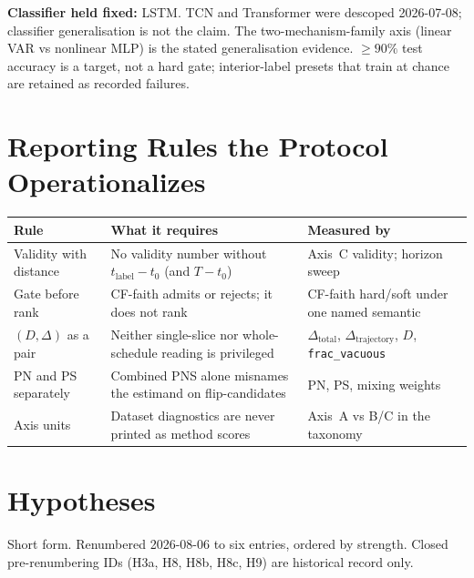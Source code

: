\documentclass[11pt]{article}
\newcommand{\Deltatotal}{\Delta_{\mathrm{total}}}
\newcommand{\Deltatraj}{\Delta_{\mathrm{trajectory}}}
\begin{document}
\noindent\textbf{Classifier held fixed:} LSTM. TCN and Transformer were
descoped 2026-07-08; classifier generalisation is not the claim. The
two-mechanism-family axis (linear VAR vs nonlinear MLP) is the stated
generalisation evidence. $\ge 90\%$ test accuracy is a target, not a
hard gate; interior-label presets that train at chance are retained as
recorded failures.

\section{Reporting Rules the Protocol Operationalizes}

\begin{table}[h!]
  \centering
  \begin{tabularx}{\textwidth}{@{}l X X@{}}
    \toprule
    \textbf{Rule} & \textbf{What it requires} & \textbf{Measured by} \\
    \midrule
    Validity with distance &
      No validity number without $t_{\mathrm{label}} - t_0$
      (and $T - t_0$) &
      Axis~C validity; horizon sweep \\
    Gate before rank &
      CF-faith admits or rejects; it does not rank &
      CF-faith hard/soft under one named semantic \\
    $(D, \Delta)$ as a pair &
      Neither single-slice nor whole-schedule reading is privileged &
      $\Deltatotal$, $\Deltatraj$, $D$, \texttt{frac\_vacuous} \\
    PN and PS separately &
      Combined PNS alone misnames the estimand on flip-candidates &
      PN, PS, mixing weights \\
    Axis units &
      Dataset diagnostics are never printed as method scores &
      Axis~A vs B/C in the taxonomy \\
    \bottomrule
  \end{tabularx}
\end{table}

\section{Hypotheses}

Short form. Renumbered 2026-08-06 to six entries, ordered by strength.
Closed pre-renumbering IDs (H3a, H8, H8b, H8c, H9) are historical
record only.
\end{document}
